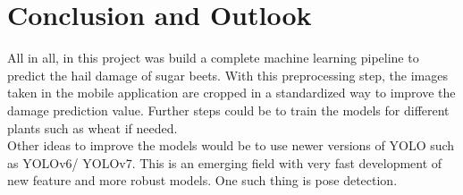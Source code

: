 
\chapter{Conclusion and Outlook}
All in all, in this project was build a complete machine learning pipeline to predict the hail damage of sugar beets. With this preprocessing step, the images taken in the mobile application are cropped in a standardized way to improve the damage prediction value. Further steps could be to train the models for different plants such as wheat if needed. \\

Other ideas to improve the models would be to use newer versions of YOLO such as YOLOv6/ YOLOv7. This is an emerging field with very fast development of new feature and more robust models. One such thing is pose detection.